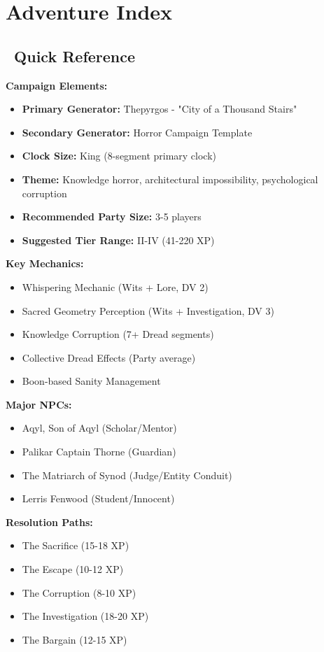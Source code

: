 \documentclass[11pt]{article}
\begin{document}
\section{Adventure Index}

\subsection*{\faList\ Quick Reference}

\textbf{Campaign Elements:}
\begin{itemize}
    \item \textbf{Primary Generator:} Thepyrgos - "City of a Thousand Stairs"
    \item \textbf{Secondary Generator:} Horror Campaign Template
    \item \textbf{Clock Size:} King (8-segment primary clock)
    \item \textbf{Theme:} Knowledge horror, architectural impossibility, psychological corruption
    \item \textbf{Recommended Party Size:} 3-5 players
    \item \textbf{Suggested Tier Range:} II-IV (41-220 XP)
\end{itemize}

\textbf{Key Mechanics:}
\begin{itemize}
    \item Whispering Mechanic (Wits + Lore, DV 2)
    \item Sacred Geometry Perception (Wits + Investigation, DV 3)
    \item Knowledge Corruption (7+ Dread segments)
    \item Collective Dread Effects (Party average)
    \item Boon-based Sanity Management
\end{itemize}

\textbf{Major NPCs:}
\begin{itemize}
    \item Aqyl, Son of Aqyl (Scholar/Mentor)
    \item Palikar Captain Thorne (Guardian)
    \item The Matriarch of Synod (Judge/Entity Conduit)
    \item Lerris Fenwood (Student/Innocent)
\end{itemize}

\textbf{Resolution Paths:}
\begin{itemize}
    \item The Sacrifice (15-18 XP)
    \item The Escape (10-12 XP)
    \item The Corruption (8-10 XP)
    \item The Investigation (18-20 XP)
    \item The Bargain (12-15 XP)
\end{itemize}
\end{document}
